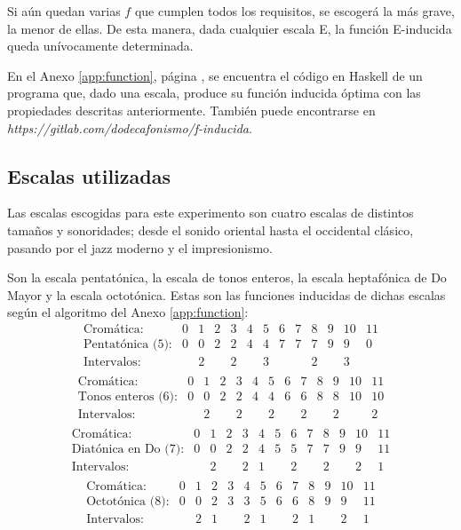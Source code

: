 		Si aún quedan varias $f$ que cumplen todos los requisitos, se escogerá la más grave, la menor de ellas. De esta manera, dada cualquier escala E, la función E-inducida queda unívocamente determinada.
		
		En el Anexo \ref{app:function}, página \pageref{app:function}, se encuentra el código en Haskell de un programa que, dado una escala, produce su función inducida óptima con las propiedades descritas anteriormente. También puede encontrarse en \textit{https://gitlab.com/dodecafonismo/f-inducida}.
		
	\subsection{Escalas utilizadas}
	
		Las escalas escogidas para este experimento son cuatro escalas de distintos tamaños y sonoridades; desde el sonido oriental hasta el occidental clásico, pasando por el jazz moderno y el impresionismo.
		
		Son la escala pentatónica, la escala de tonos enteros, la escala heptafónica de Do Mayor y la escala octotónica. Estas son las funciones inducidas de dichas escalas según el algoritmo del Anexo \ref{app:function}:
		\[\left.\begin{matrix}
		\text{Cromática:}&0&1&2&3&4&5&6&7&8&9&10&11\\
		\text{Pentatónica (5):}&0&0&2&2&4&4&7&7&7&9&9&0\\
		\text{Intervalos:}&&2&&2&&3&&&2&&3&\\
		\end{matrix}\right.\]		
		\[\left.\begin{matrix}
		\text{Cromática:}&0&1&2&3&4&5&6&7&8&9&10&11\\
		\text{Tonos enteros (6):}&0&0&2&2&4&4&6&6&8&8&10&10\\
		\text{Intervalos:}&&2&&2&&2&&2&&2&&2\\
		\end{matrix}\right.\]
        \[\left.\begin{matrix}
        \text{Cromática:}&0&1&2&3&4&5&6&7&8&9&10&11\\
        \text{Diatónica en Do (7):}&0&0&2&2&4&5&5&7&7&9&9&11\\
        \text{Intervalos:}&&2&&2&1&&2&&2&&2&1\\
        \end{matrix}\right.\]        
        \[\left.\begin{matrix}
        \text{Cromática:}&0&1&2&3&4&5&6&7&8&9&10&11\\
        \text{Octotónica (8):}&0&0&2&3&3&5&6&6&8&9&9&11\\
        \text{Intervalos:}&&2&1&&2&1&&2&1&&2&1\\
        \end{matrix}\right.\]
        
